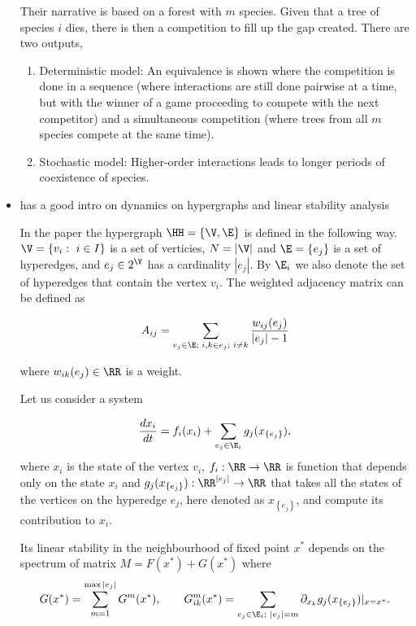 \begin{itemize}
Their narrative is based on a forest with $ m $ species. Given that a tree of species $ i $ dies, there is then a competition to fill up the gap created. There are two outputs,
\begin{enumerate}
    \item Deterministic model: An equivalence is shown where the competition is done in a sequence (where interactions are still done pairwise at a time, but with the winner of a game proceeding to compete with the next competitor) and a simultaneous competition (where trees from all $ m $ species compete at the same time).
    \item Stochastic model: Higher-order interactions leads to longer periods of coexistence of species.
\end{enumerate}

    \item \cite{Arruda} 
    has a good intro on dynamics on hypergraphs and linear stability analysis
    
    In the paper the hypergraph $\HH =\left\{\V,\E\right\}$ is defined in the following way. $\V=\left\{ v_i:\,\,i\in I\right\}$ is a set of verticies, $N=|\V|$ and $\E=\left\{e_j\right\}$ is a set of hyperedges, and $e_j\in 2^{\V}$ has a cardinality $|e_j|$. By $\E_i$ we also denote the set of hyperedges that contain the vertex $v_i$. The weighted adjacency matrix can be defined as

\[
A_{ij}=\sum_{e_j\in \E;\,\, i,k\in e_j;\,\,i\neq k }\frac{w_{ij}(e_j)}{|e_j|-1}
\]

where $w_{ik}(e_j)\in \RR$ is a weight.

    Let us consider a system

    \begin{equation}\label{eq:main}
\frac{dx_i}{dt}=f_i(x_i)+\sum_{e_j\in \E_i}g_j(x_{\left\{e_j\right\}}),
    \end{equation}
    where $x_i$ is the state of the vertex $v_i$, $f_i:\RR \rightarrow \RR$ is function that depends only on the state $x_i$ and $g_j(x_{\left\{e_j\right\}}):\RR^{|e_j|}\rightarrow \RR$ that takes all the states of the vertices on the hyperedge $e_j$, here denoted as $x_{\left\{e_j\right\}}$, and compute its contribution to $x_i$.

    Its linear stability in the neighbourhood of fixed point $x^*$ depends on the spectrum of matrix $M=F(x^*)+G(x^*)$ where 
    \[
    G(x^*)=\sum_{m=1}^{\max{|e_j|}}G^m(x^*), \qquad G^m_{ik}(x^*)=\sum_{e_j\in \E_i;\,\,|e_j|=m}\partial_{x_k}g_j(x_{\left\{e_j\right\}})|_{x=x^*}.
    \]


\end{itemize}
